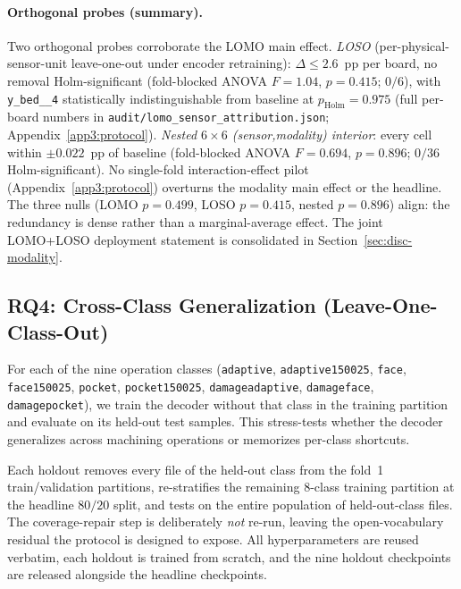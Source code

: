 \documentclass[sensors,article,submit,moreauthors,pdftex]{Definitions/mdpi}
\begin{document}
\paragraph{Orthogonal probes (summary).}\label{sec:abl-lomo-sensor-stub} Two orthogonal probes corroborate the LOMO main effect. \emph{LOSO} (per-physical-sensor-unit leave-one-out under encoder retraining): $\Delta\!\le\!2.6$~pp per board, no removal Holm-significant (fold-blocked ANOVA $F\!=\!1.04$, $p\!=\!0.415$; $0/6$), with \texttt{y\_bed\_\_4} statistically indistinguishable from baseline at $p_{\text{Holm}}\!=\!0.975$ (full per-board numbers in \texttt{audit/lomo\_sensor\_attribution.json}; Appendix~\ref{app3:protocol}). \emph{Nested $6\!\times\!6$ (sensor,modality) interior}: every cell within $\pm 0.022$~pp of baseline (fold-blocked ANOVA $F\!=\!0.694$, $p\!=\!0.896$; $0/36$ Holm-significant). No single-fold interaction-effect pilot (Appendix~\ref{app3:protocol}) overturns the modality main effect or the headline. The three nulls (LOMO $p\!=\!0.499$, LOSO $p\!=\!0.415$, nested $p\!=\!0.896$) align: the redundancy is dense rather than a marginal-average effect. The joint LOMO+LOSO deployment statement is consolidated in Section~\ref{sec:disc-modality}.


\subsection{RQ4: Cross-Class Generalization (Leave-One-Class-Out)}
\label{sec:loco}

For each of the nine operation classes (\texttt{adaptive}, \texttt{adaptive150025}, \texttt{face}, \texttt{face150025}, \texttt{pocket}, \texttt{pocket150025}, \texttt{damageadaptive}, \texttt{damageface}, \texttt{damagepocket}), we train the decoder without that class in the training partition and evaluate on its held-out test samples. This stress-tests whether the decoder generalizes across machining operations or memorizes per-class shortcuts.

Each holdout removes every file of the held-out class from the fold~1 train/validation partitions, re-stratifies the remaining $8$-class training partition at the headline $80/20$ split, and tests on the entire population of held-out-class files. The coverage-repair step is deliberately \emph{not} re-run, leaving the open-vocabulary residual the protocol is designed to expose. All hyperparameters are reused verbatim, each holdout is trained from scratch, and the nine holdout checkpoints are released alongside the headline checkpoints.
\end{document}
